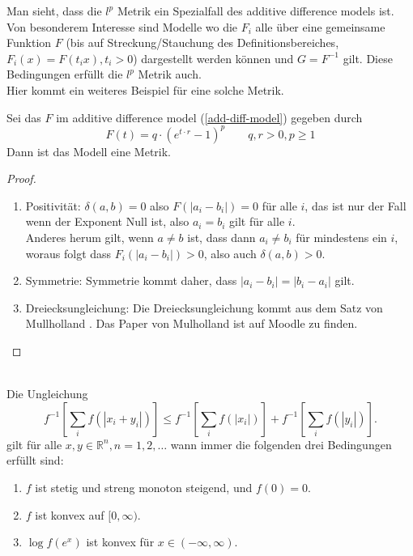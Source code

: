   Man sieht, dass die $l^p$ Metrik ein Spezialfall des additive difference models ist.
  Von besonderem Interesse sind Modelle wo die $F_i$ alle über eine gemeinsame Funktion $F$ (bis auf Streckung/Stauchung des Definitionsbereiches, $F_i(x) = F(t_i x), t_i > 0$) dargestellt werden können und $G = F^{-1}$ gilt. Diese Bedingungen erfüllt die $l^p$ Metrik auch.\\
  Hier kommt ein weiteres Beispiel für eine solche Metrik.

  \begin{ex}\label{p-exp-metric-family}
    Sei das $F$ im additive difference model (\ref{add-diff-model}) gegeben durch 
    \begin{equation}\label{p-exp-eq}
      F(t) = q \cdot (e^{t \cdot r} - 1)^p \qquad q, r > 0, p \geq 1
    \end{equation}
      Dann ist das Modell eine Metrik.
    \begin{proof}
      \begin{enumerate}
        \item Positivität: $\delta(a,b) = 0$ also $F(|a_i - b_i|) = 0$ für alle $i$, das ist nur der Fall wenn der Exponent Null ist, also $a_i = b_i$ gilt für alle $i$.\\
          Anderes herum gilt, wenn $a \neq b$ ist, dass dann $a_i \neq b_i$ für mindestens ein $i$, woraus folgt dass $F_i(|a_i - b_i|) > 0$, also auch $\delta(a,b) > 0$.
        \item Symmetrie: Symmetrie kommt daher, dass $|a_i - b_i| = |b_i - a_i|$ gilt.
        \item Dreiecksungleichung: Die Dreiecksungleichung kommt aus dem Satz von Mullholland \cite[S.~297]{mulholland}. Das Paper von Mulholland ist auf Moodle zu finden.
      \end{enumerate}
    \end{proof}
  \end{ex}

  \begin{thm}[Mulholland]~\\
Die Ungleichung
$$
 f^{-1} \left[ \sum_i f(|x_i + y_i|) \right] \leq f^{-1}  \left[ \sum_i f(|x_i|) \right] + f^{-1} \left[ \sum_i f(|y_i|) \right].
$$
gilt für alle $x, y \in \mathbb{R}^n, n = 1, 2, \ldots$ wann immer die folgenden drei Bedingungen erfüllt sind:
\begin{enumerate}
    \item $f$ ist stetig und streng monoton steigend, und $f(0) = 0$.
    \item $f$ ist konvex auf $[0, \infty)$.
    \item $\log f(e^x)$ ist konvex für $x \in (-\infty, \infty)$.
\end{enumerate}
  \end{thm}


